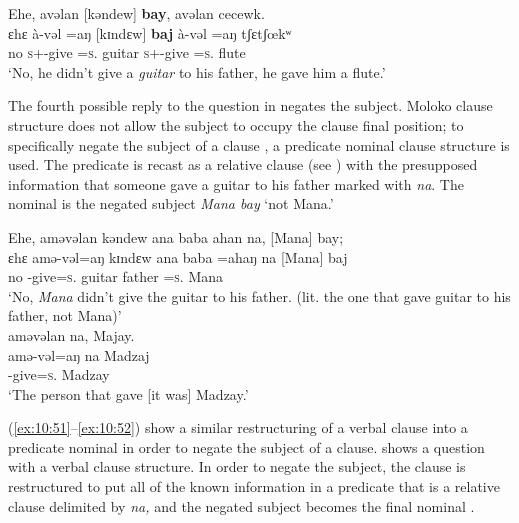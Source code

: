 \ea \label{ex:10:49}
Ehe,  avəlan  [kəndew]  \textbf{bay},  avəlan  cecewk.\\
\gll  ɛhɛ    à-vəl =aŋ   [kɪndɛw]   \textbf{baj} à-vəl =aŋ tʃɛtʃœkʷ\\
      no    \textsc{s}+{\PFV}-give =\textsc{s}.{\IO}  guitar    {\NEG} \textsc{s}+{\PFV}-give =\textsc{s}.{\IO}  flute\\
\glt  ‘No, he didn’t give a \textit{guitar} to his father, he gave him a flute.’ 
\z

The fourth possible reply to the question in  negates the subject. Moloko clause structure does not allow the subject to occupy the clause final position; to specifically negate the subject of a clause , a predicate nominal clause structure is used. The predicate is recast as a relative clause (see ) with the presupposed information that someone gave a guitar to his father marked with \textit{na}. The nominal is the negated subject \textit{Mana bay} ‘not Mana.’ 

\clearpage
\ea \label{ex:10:50}
Ehe,  aməvəlan  kəndew  ana  baba  ahan  na,  [Mana]  bay;\\  
\gll  ɛhɛ    amə-vəl=aŋ  kɪndɛw  ana  baba  =ahaŋ    na [Mana]  baj \\ 
      no    {\DEP}-give=\textsc{s}.{\IO}  guitar  {\DAT} father  =\textsc{s}.{\POSS}  {\PSP} Mana     {\NEG}  \\    
\glt ‘No, \textit{Mana} didn’t give the guitar to his father.  (lit. the one that gave guitar to his father, not Mana)’ \\    
           
      \medskip
aməvəlan  na,  Majay.\\      
\gll amə-vəl=aŋ na Madzaj\\
     {\DEP}-give=\textsc{s}.{\IO}  {\PSP}  Madzay\\
\glt  ‘The person that gave [it was] Madzay.’ 
\z

(\ref{ex:10:51}--\ref{ex:10:52}) show a similar restructuring of a verbal clause into a predicate nominal in order to negate the subject of a clause.  shows a question with a verbal clause structure. In order to negate the subject, the clause is restructured to put all of the known information in a predicate that is a relative clause delimited by\textit{ na,} and the negated subject becomes the final nominal . 

